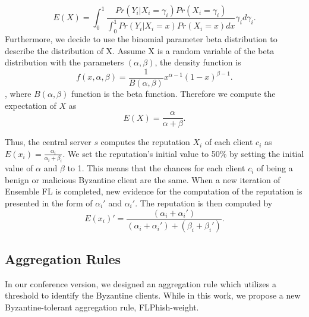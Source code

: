 \documentclass[journal]{IEEEtran}
\begin{document}
\begin{equation}
    E(X)=\int_{0}^{1}\frac{Pr\left ( Y_{i}|X_{i}=\gamma_{i} \right )Pr(X_{i}=\gamma_{i})}{\int_{0}^{1}Pr\left ( Y_{i}|X_{i}=x \right )Pr(X_{i}=x)dx}\gamma_{i}d\gamma_{i}\label{equation_3}.
\end{equation}
Furthermore, we decide to use the binomial parameter beta distribution to describe the distribution of X. Assume X is a random variable of the beta distribution with the parameters $(\alpha, \beta)$, the density function is
\begin{equation}
    f(x,\alpha,\beta)=\frac{1}{B(\alpha,\beta)}x^{\alpha-1}(1-x)^{\beta-1}\label{equation-4}.
\end{equation}
, where $B(\alpha, \beta)$ function is the beta function. Therefore we compute the expectation of $X$ as
\begin{equation}
    E(X)=\frac{\alpha}{\alpha+\beta}.
\end{equation}

Thus, the central server ${s}$ computes the reputation $X_i$ of each client ${c_{i}}$ as ${E(x_{i})=\frac{\alpha_{i}}{\alpha_{i}+\beta_{i}}}$. We set the reputation's initial value to 50\% by setting the initial value of $\alpha$ and $\beta$ to 1. This means that the chances for each client $c_ i$ of being a benign or malicious Byzantine client are the same. When a new iteration of Ensemble FL is completed, new evidence for the computation of the reputation is presented in the form of ${\alpha_{i}}'$ and ${\alpha_{i}}'$. The reputation is then computed by
\begin{equation}
    {E(x_{i})}'=\frac{(\alpha_{i}+{\alpha_{i}}')}{(\alpha_{i}+{\alpha_{i}}')+(\beta_{i}+{\beta_{i}}')}.
\end{equation}



\subsection{Aggregation Rules}
In our conference version, we designed an aggregation rule which utilizes a threshold to identify the Byzantine clients. While in this work, we propose a new Byzantine-tolerant aggregation rule, FLPhish-weight.
\end{document}
